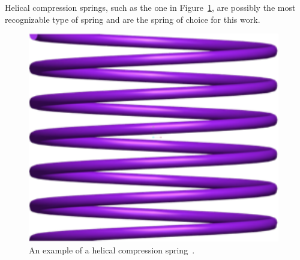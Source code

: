 \documentclass[10pt]{article}
\begin{document}
Helical compression springs, such as the one in Figure~\ref{fig:Spring}, are possibly the most recognizable type of spring and are the spring of choice for this work. 

		\begin{figure}[h]
		 \begin{center}\includegraphics[scale=.2]{Spring.png}\end{center}
		 \caption{An example of a helical compression spring~\cite{Massad2015}.}
		 \label{fig:Spring}
		 
		 \end{figure}
\end{document}
